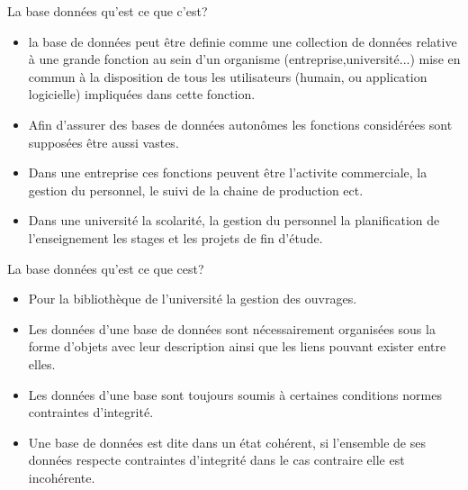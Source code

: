 \documentclass{beamer}
\begin{document}
\begin{frame}{La base donn\'ees qu'est ce que c'est?}
 \begin{itemize}
        \item la base de donn\'ees peut \^etre definie comme une collection de donn\'ees relative \`a une grande fonction au sein d'un organisme (entreprise,universit\'e...) mise en commun \`a la disposition de tous les utilisateurs (humain, ou application logicielle) impliqu\'ees dans cette fonction.   
        \item Afin d'assurer des bases de donn\'ees auton\^omes les fonctions consid\'er\'ees sont suppos\'ees \^etre aussi  vastes.
        \item Dans une entreprise ces fonctions peuvent \^etre l'activite commerciale, la gestion du personnel, le suivi de la chaine de production ect.
        \item Dans une universit\'e la scolarit\'e, la gestion du personnel la planification de l'enseignement les stages et les projets de fin d'\'etude.


    \end{itemize}

\end{frame}

\begin{frame}{La base donn\'ees qu'est ce que cest?}

  \begin{itemize}
   \item Pour la biblioth\`eque de l'universit\'e la gestion des ouvrages.
        \item Les donn\'ees d'une base de donn\'ees sont n\'ecessairement organis\'ees sous la forme d'objets avec leur description ainsi que les liens pouvant exister entre elles.
        \item Les donn\'ees d'une base sont toujours soumis \`a certaines conditions normes contraintes d'integrit\'e.
        \item Une base de donn\'ees est dite dans un \'etat coh\'erent, si l'ensemble de ses donn\'ees respecte  contraintes d'integrit\'e dans le cas contraire elle est incoh\'erente. 
    \end{itemize}
    
\end{frame}
\end{document}
